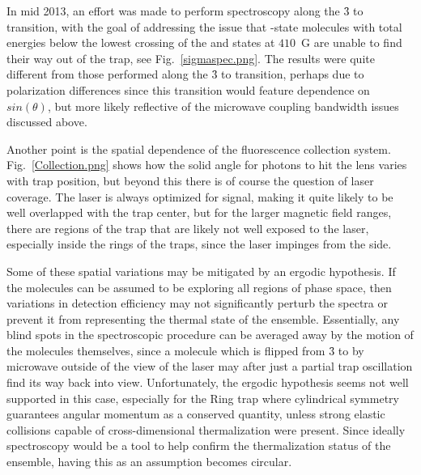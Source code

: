 \documentclass[defaultstyle,11pt]{thesis}
\begin{document}
In mid 2013, an effort was made to perform spectroscopy along the \f3 to  transition, with the goal of addressing the issue that -state molecules with total energies below the lowest crossing of the  and  states at $410$~G are unable to find their way out of the trap, see Fig.~\ref{sigmaspec.png}.
The results were quite different from those performed along the \f3 to  transition, perhaps due to polarization differences since this transition would feature dependence on $sin(\theta)$, but more likely reflective of the microwave coupling bandwidth issues discussed above.


Another point is the spatial dependence of the fluorescence collection system.
Fig.~\ref{Collection.png} shows how the solid angle for photons to hit the lens varies with trap position, but beyond this there is of course the question of laser coverage.
The laser is always optimized for signal, making it quite likely to be well overlapped with the trap center, but for the larger magnetic field ranges, there are regions of the trap that are likely not well exposed to the laser, especially inside the rings of the traps, since the laser impinges from the side.


Some of these spatial variations may be mitigated by an ergodic hypothesis.
If the molecules can be assumed to be exploring all regions of phase space, then variations in detection efficiency may not significantly perturb the spectra or prevent it from representing the thermal state of the ensemble.
Essentially, any blind spots in the spectroscopic procedure can be averaged away by the motion of the molecules themselves, since a molecule which is flipped from \f3 to  by microwave outside of the view of the laser may after just a partial trap oscillation find its way back into view.
Unfortunately, the ergodic hypothesis seems not well supported in this case, especially for the Ring trap where cylindrical symmetry guarantees angular momentum as a conserved quantity, unless strong elastic collisions capable of cross-dimensional thermalization were present.
Since ideally spectroscopy would be a tool to help confirm the thermalization status of the ensemble, having this as an assumption becomes circular.
\end{document}
